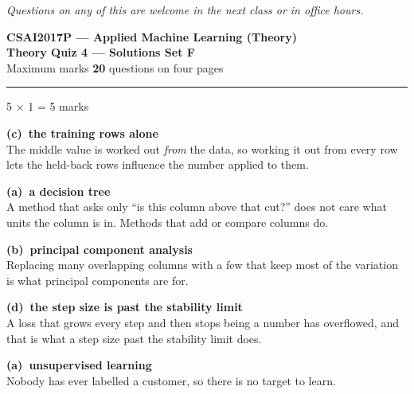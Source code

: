 \documentclass[10pt,a4paper]{article}
\newcommand{\SetLetter}{}
\newcommand{\parthead}[2]{\vspace{2pt}\noindent\rule{\linewidth}{0.4pt}\par\vspace{2pt}%
  \noindent{\bfseries Part #1}\hfill{\small #2}\par\vspace{1pt}}
\newcommand{\sol}[1]{\textbf{#1}}
\begin{document}
\vfill

{\footnotesize\itshape Questions on any of this are welcome in the next class or in office hours.}

\newpage


\renewcommand{\SetLetter}{F}\setcounter{page}{1}

\begin{center}
{\large\bfseries CSAI2017P --- Applied Machine Learning (Theory)}\\[2pt]
{\large\bfseries Theory Quiz 4 --- Solutions \quad\textbullet\quad Set F}\\[3pt]
{\small Maximum marks \textbf{20} \quad\textbullet{} questions on four pages}
\end{center}
\vspace{2pt}

\noindent{}
\vspace{3pt}


\parthead{A --- Multiple choice}{5 $\times$ 1 = 5 marks}

\begin{sA}

  \item \sol{(c)\ the training rows alone}\\ The middle value is worked out \emph{from} the data, so working it out from every row lets the held-back rows influence the number applied to them.

  \item \sol{(a)\ a decision tree}\\ A method that asks only ``is this column above that cut?'' does not care what units the column is in. Methods that add or compare columns do.

  \item \sol{(b)\ principal component analysis}\\ Replacing many overlapping columns with a few that keep most of the variation is what principal components are for.

  \item \sol{(d)\ the step size is past the stability limit}\\ A loss that grows every step and then stops being a number has overflowed, and that is what a step size past the stability limit does.

  \item \sol{(a)\ unsupervised learning}\\ Nobody has ever labelled a customer, so there is no target to learn.

\end{sA}
\end{document}
